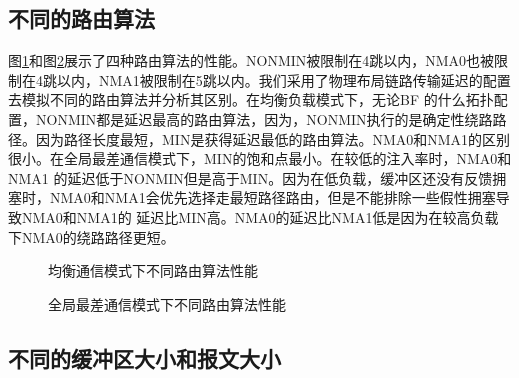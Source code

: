   \subsection{不同的路由算法}

图\ref{l1ra01}和图\ref{l1ra02}展示了四种路由算法的性能。NONMIN被限制在4跳以内，NMA0也被限制在4跳以内，NMA1被限制在5跳以内。我们采用了物理布局链路传输延迟的配置去模拟不同的路由算法并分析其区别。在均衡负载模式下，无论BF 的什么拓扑配置，NONMIN都是延迟最高的路由算法，因为，NONMIN执行的是确定性绕路路径。因为路径长度最短，MIN是获得延迟最低的路由算法。NMA0和NMA1的区别
很小。在全局最差通信模式下，MIN的饱和点最小。在较低的注入率时，NMA0和NMA1
的延迟低于NONMIN但是高于MIN。因为在低负载，缓冲区还没有反馈拥塞时，NMA0和NMA1会优先选择走最短路径路由，但是不能排除一些假性拥塞导致NMA0和NMA1的
延迟比MIN高。NMA0的延迟比NMA1低是因为在较高负载下NMA0的绕路路径更短。

  \begin{figure}[t]
\setlength{\belowcaptionskip}{-.5cm}%
  \centering
 \begin{minipage}[t]{\textwidth}
   \centering
  \vspace{-.3cm}
  \caption{均衡通信模式下不同路由算法性能}
  \label{l1ra01}
  \end{minipage}
  \end{figure}

   \begin{figure}[t]
\setlength{\belowcaptionskip}{-.5cm}%
  \centering
 \begin{minipage}[t]{\textwidth}
   \centering
  \vspace{-.3cm}
  \caption{全局最差通信模式下不同路由算法性能}
  \label{l1ra02}
  \end{minipage}
  \end{figure}

  \subsection{不同的缓冲区大小和报文大小}

